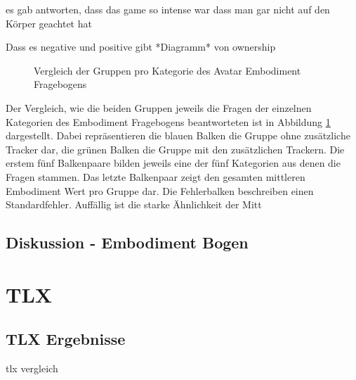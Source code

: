 es gab antworten, dass das game so intense war dass man gar nicht auf den Körper geachtet hat



Dass es negative und positive gibt
*Diagramm* von ownership

\begin{figure}[h]
  \caption[Avatar Embodiment Durchschnitte pro Kategorie]{Vergleich der Gruppen pro Kategorie des Avatar Embodiment Fragebogens}
  \label{fig:TotalEmbodiment-Kategorien}
\end{figure}

Der Vergleich, wie die beiden Gruppen jeweils die Fragen der einzelnen Kategorien des Embodiment Fragebogens beantworteten ist in Abbildung \ref{fig:TotalEmbodiment-Kategorien} dargestellt. Dabei repräsentieren die blauen Balken die Gruppe ohne zusätzliche Tracker dar, die grünen Balken die Gruppe mit den zusätzlichen Trackern. Die erstem fünf Balkenpaare bilden jeweils eine der fünf Kategorien aus denen die Fragen stammen. Das letzte Balkenpaar zeigt den gesamten mittleren Embodiment Wert pro Gruppe dar. Die Fehlerbalken beschreiben einen Standardfehler.
Auffällig ist die starke Ähnlichkeit der Mitt


\subsection{Diskussion - Embodiment Bogen}


\section{TLX}


\subsection{TLX Ergebnisse}
\cite{Abtahi2019}
tlx vergleich

